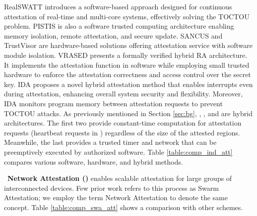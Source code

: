 RealSWATT \cite{surminski2021realswatt} introduces a software-based approach designed for continuous attestation of real-time and multi-core systems, effectively solving the TOCTOU problem.
PISTIS \cite{grisafi2022pistis} is also a software trusted computing architecture enabling memory isolation, remote attestation, and secure update.
SANCUS \cite{noorman2013sancus} and TrustVisor \cite{mccune2010trustvisor} are hardware-based solutions offering attestation service with software module isolation. 
VRASED \cite{vrased} presents a formally verified hybrid RA architecture.
It implements the attestation function in software while employing small trusted hardware to enforce the attestation correctness and access control over the \ra secret key.
IDA \cite{arkannezhadida} proposes a novel hybrid attestation method that enables interrupts even during attestation, enhancing overall system security and flexibility.
Moreover, IDA monitors program memory between attestation requests to prevent TOCTOU attacks.
As previously mentioned in Section \ref{sec:bg}, \rata, \casu, and \garota are hybrid \ra architectures.
The first two provide constant-time computation for attestation requests (heartbeat requests in \casu) regardless of the size of the attested regions.
Meanwhile, the last provides a trusted timer and network that can be preemptively executed by authorized software.
Table \ref{table:comp_ind_att} compares various software, hardware, and hybrid \ra methods.

\noindent~{\bf Network Attestation (\sa)}
%
enables scalable attestation for large groups of interconnected devices. Few prior work \cite{asokan2015seda,ambrosin2016sana,carpent2017lightweight,ibrahim2017seed,ibrahim2016darpa,kohnhauser2017scapi,nunes2019towards,kohnhauser2018salad,petzi2022scraps,kuang2019esdra,abera2019diat} refers to this process as Swarm Attestation; we employ the term Network Attestation to denote the same concept. Table \ref{table:comp_swa_att} shows a comparison with other \sa schemes.

